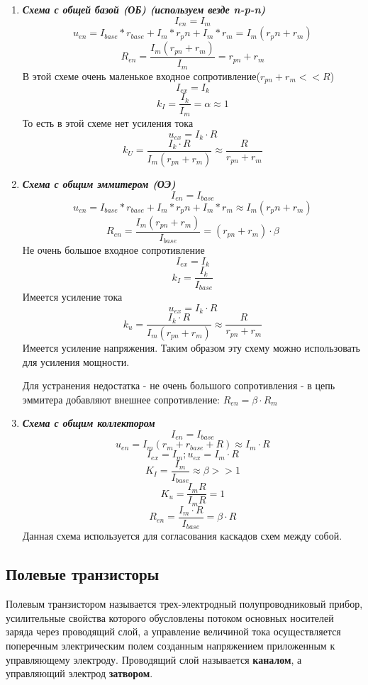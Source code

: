 \documentclass[../main.tex]{subfiles}
\begin{document}
\begin{enumerate}
    \item \textbf{\textit{Схема с общей базой (ОБ) (используем везде n-p-n)}}
    \[I_{en} = I_m\]
    \[u_{en} = I_{base}*r_{base} + I_m*r_pn + I_m*r_m = I_m(r_pn + r_m)\]
    \[R_{en} = \frac{I_m(r_{pn} + r_m)}{I_m} = r_{pn} + r_m\]
    В этой схеме очень маленькое входное сопротивление($r_{pn} + r_m << R$)
    \[I_{ex} = I_k\]
    \[k_I = \frac{I_k}{I_m} = \alpha \approx 1\]
    То есть в этой схеме нет усиления тока
    \[u_{ex} = I_k \cdot R\]
    \[k_U = \frac{I_k \cdot R}{I_m(r_{pn} + r_m)} \approx \frac{R}{r_{pn} + r_m}\]
    \item \textbf{\textit{Схема с общим эммитером (ОЭ)}}
    \[I_{en} = I_{base}\]
    \[u_{en} = I_{base}*r_{base} + I_m*r_pn + I_m*r_m \approx I_m(r_pn + r_m)\]
    \[R_{en} = \frac{I_m(r_{pn} + r_m)}{I_{base}} = (r_{pn} + r_m)\cdot \beta\]
    Не очень большое входное сопротивление
    \[I_{ex} = I_k\]
    \[k_I =\frac{I_k}{I_{base}}\]
    Имеется усиление тока
    \[u_{ex} = I_k \cdot R\]
    \[k_u = \frac{I_k \cdot R}{I_m(r_{pn} + r_m)} \approx \frac{R}{r_{pn} +r_m}\]
    Имеется усиление напряжения. Таким образом эту схему можно использовать для усиления мощности.

    Для устранения недостатка - не очень большого сопротивления - в цепь эммитера добавляют внешнее сопротивление: $R_{en} = \beta \cdot R_m$
    \item \textbf{\textit{Схема с общим коллектором}}
    \[I_{en} = I_{base}\]
    \[u_{en} = I_m(r_m+r_{base} + R) \approx I_m \cdot R\]
    \[I_{ex} = I_m; u_{ex} = I_m \cdot R\]
    \[K_I = \frac{I_m}{I_{base}} \approx \beta >> 1 \]
    \[K_u = \frac{I_m R}{I_m R} = 1\]
    \[R_{en} = \frac{I_m \cdot R}{I_{base}} = \beta \cdot R\]
    Данная схема используется для согласования каскадов схем между собой.
\end{enumerate}

\subsection{Полевые транзисторы}

 Полевым транзистором называется трех-электродный полупроводниковый прибор, усилительные свойства которого обусловлены потоком основных носителей заряда через проводящий слой, а 
управление величиной тока осуществляется поперечным электрическим полем созданным напряжением приложенным к управляющему электроду. Проводящий слой называется \textbf{каналом}, а управляющий 
электрод \textbf{затвором}.
\end{document}
